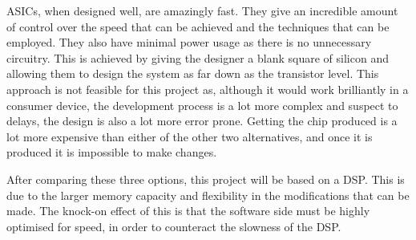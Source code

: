 ASICs, when designed well, are amazingly fast.
They give an incredible amount of control over the speed that can be achieved and the techniques that can be employed.
They also have minimal power usage as there is no unnecessary circuitry.
This is achieved by giving the designer a blank square of silicon and allowing them to design the system as far down as the transistor level.
This approach is not feasible for this project as, although it would work brilliantly in a consumer device, the development process is a lot more complex and suspect to delays, the design is also a lot more error prone.
Getting the chip produced is a lot more expensive than either of the other two alternatives, and once it is produced it is impossible to make changes.

After comparing these three options, this project will be based on a DSP.
This is due to the larger memory capacity and flexibility in the modifications that can be made.
The knock-on effect of this is that the software side must be highly optimised for speed, in order to counteract the slowness of the DSP. 
